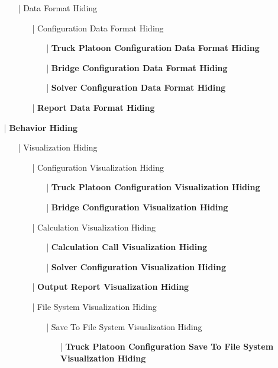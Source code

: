 \documentclass[12pt, titlepage]{article}
\begin{document}
\begin{enumerate}
\begin{enumerate}
        \item[|] Data Format Hiding
        \begin{enumerate}
            \item[|] Configuration Data Format Hiding
            \begin{itemize}
                \item[|] \textbf{Truck Platoon Configuration Data Format Hiding}
                \item[|] \textbf{Bridge Configuration Data Format Hiding}
                \item[|] \textbf{Solver Configuration Data Format Hiding}
            \end{itemize}
            \item[|] \textbf{Report Data Format Hiding}
        \end{enumerate}
    \end{enumerate}
    \item[|] \textbf{Behavior Hiding}
    \begin{enumerate}
        \item[|] Visualization Hiding
        \begin{enumerate}
            \item[|] Configuration Visualization Hiding
            \begin{itemize}
                \item[|] \textbf{Truck Platoon Configuration Visualization Hiding}
                \item[|] \textbf{Bridge Configuration Visualization Hiding}
            \end{itemize}
            \item[|] Calculation Visualization Hiding
            \begin{itemize}
                \item[|] \textbf{Calculation Call Visualization Hiding}
                \item[|] \textbf{Solver Configuration Visualization Hiding}
            \end{itemize}
            \item[|] \textbf{Output Report Visualization Hiding}
            \item[|] File System Visualization Hiding
            \begin{itemize}
                \item[|] {Save To File System Visualization Hiding}
                \begin{itemize}
                    \item[|] \textbf{Truck Platoon Configuration Save To File System Visualization Hiding}

\end{itemize}
\end{itemize}
\end{enumerate}
\end{enumerate}
\end{enumerate}
\end{document}
